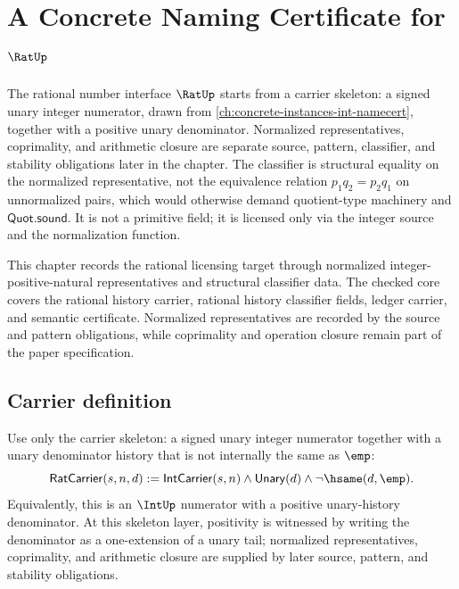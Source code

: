 \chapter{A Concrete Naming Certificate for \(\RatUp\)}
\label{ch:concrete-instances-rat-namecert}

The rational number interface $\RatUp$ starts from a carrier skeleton: a signed unary integer numerator, drawn from \autoref{ch:concrete-instances-int-namecert}, together with a positive unary denominator. Normalized representatives, coprimality, and arithmetic closure are separate source, pattern, classifier, and stability obligations later in the chapter. The classifier is structural equality on the normalized representative, not the equivalence relation $p_1 q_2 = p_2 q_1$ on unnormalized pairs, which would otherwise demand quotient-type machinery and $\mathsf{Quot.sound}$. It is not a primitive field; it is licensed only via the integer source and the normalization function.

\begin{remark}
\label{rem:concrete-instances-rat-namecert-roadmap}
This chapter records the rational licensing target through normalized
integer-positive-natural representatives and structural classifier data.
The checked core covers the rational history carrier, rational history classifier fields, ledger carrier, and semantic certificate. Normalized representatives are recorded by the source and pattern obligations, while coprimality and operation closure remain part of the paper specification.
\end{remark}

\section{Carrier definition}

\begin{definition}
\label{def:rat-carrier}
Use only the carrier skeleton: a signed unary integer numerator together with a unary denominator history that is not internally the same as $\emp$:
$$
  \mathsf{RatCarrier}(s,n,d)
  :=
  \mathsf{IntCarrier}(s,n)\land \mathsf{Unary}(d)\land \neg\hsame(d,\emp).
$$
Equivalently, this is an $\IntUp$ numerator with a positive unary-history denominator. At this skeleton layer, positivity is witnessed by writing the denominator as a one-extension of a unary tail; normalized representatives, coprimality, and arithmetic closure are supplied by later source, pattern, and stability obligations.
\end{definition}

